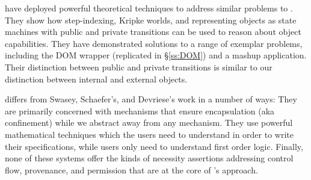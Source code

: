 \cite{dd}  have deployed
   powerful %
  theoretical techniques to address similar problems to \Nec.  %
  They show how step-indexing, Kripke worlds, and representing objects
as state machines with public and private transitions can be used to
reason about %
object capabilities.
They have demonstrated solutions to a range of exemplar problems,
including the DOM wrapper (replicated in 
\S\ref{ss:DOM}) and a mashup application.
Their distinction
between public and private transitions %
is similar to our
distinction between internal and external objects.

 

\Nec differs from Swasey, Schaefer's, and Devriese's work in a number of ways:
They are primarily concerned with %
mechanisms that ensure encapsulation (aka 
confinement) while we abstract away from any mechanism.
They use powerful mathematical techniques
which  the users need  to understand in order to write their specifications,
while \Nec users only need  to understand  first order logic.
Finally, none of these systems offer the kinds of
necessity assertions addressing control flow, provenance, and permission that are at the core of \Nec's approach.




















